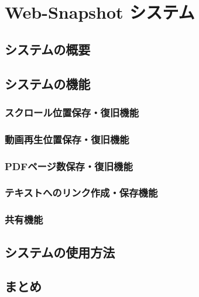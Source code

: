 \chapter{Web-Snapshot システム}
\label{chap:web_snapshot_system}

\section{システムの概要}



\section{システムの機能}
\subsection{スクロール位置保存・復旧機能}
\subsection{動画再生位置保存・復旧機能}
\subsection{PDFページ数保存・復旧機能}
\subsection{テキストへのリンク作成・保存機能}
\subsection{共有機能}

\section{システムの使用方法}
\section{まとめ}

